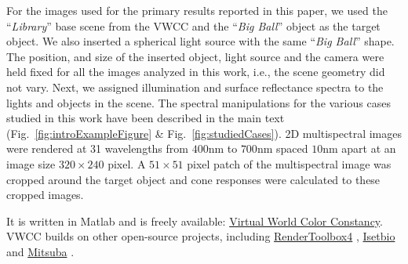 \documentclass{jov}
\begin{document}
For the images used for the primary results reported in this paper, we used the ``{\it Library}'' base scene from the VWCC  and the ``{\it Big Ball}'' object as the target object. We also inserted a spherical light source with the same ``{\it Big Ball}'' shape. The position, and size of the inserted object, light source and the camera were held fixed for all the images analyzed in this work, i.e., the scene geometry did not vary. Next, we assigned illumination and surface reflectance spectra to the lights and objects in the scene. The spectral manipulations for the various cases studied in this work have been described in the main text (Fig.~\ref{fig:introExampleFigure} \& Fig.~\ref{fig:studiedCases}). 2D multispectral images were rendered at 31 wavelengths from $400$nm to $700$nm spaced $10$nm apart at an image size $320\times 240$ pixel. A $51 \times 51$ pixel patch of the multispectral image was cropped around the target object and cone responses were calculated to these cropped images. 

It is written in Matlab and is freely available: \href{https://github.com/BrainardLab/VirtualWorldColorConstancy}{Virtual World Color Constancy}. VWCC builds on other open-source projects, including \href{http://rendertoolbox.org}{RenderToolbox4} \cite{heasly2014rendertoolbox3}, \href{http://isetbio.org}{Isetbio} and \href{https://www.mitsuba-renderer.org}{Mitsuba} \cite{jakob2015mitsuba}.
\end{document}
